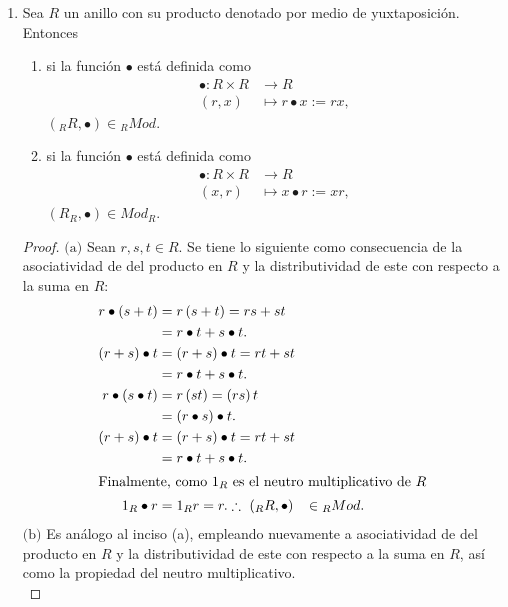 \documentclass{article}
\newcommand{\lrprth}[1]{
    \left(#1\right)
}
\newcommand{\descapp}[6]{
    #1: #2 &\rightarrow #3\\
    #4 &\mapsto #5#6 
}
\theoremstyle{definition}
\theoremstyle{plain}
\theoremstyle{plain}
\theoremstyle{definition}
\theoremstyle{definition}
\theoremstyle{definition}
\theoremstyle{definition}
\theoremstyle{definition}
\theoremstyle{definition}
\begin{document}
\begin{enumerate}[label=\textbf{Ej \arabic*.}]
    \item Sea $R$ un anillo con su producto denotado por medio de yuxtaposición. Entonces
    \begin{enumerate}[label=(\alph*)]
        \item si la función $\bullet$ está definida como
        \begin{align*}
            \descapp{\bullet}{R\times R}{R}{(r,x)}{r\bullet x:=rx}{,}
        \end{align*}
        $\lrprth{{}_RR,\bullet}\in {}_RMod$.
        \item si la función $\bullet$ está definida como
        \begin{align*}
            \descapp{\bullet}{R\times R}{R}{(x,r)}{x\bullet r:=xr}{,}
        \end{align*}
        $(R_R,\bullet)\in Mod_R$.
    \end{enumerate}
    \begin{proof}
    $\boxed{\text{(a)}}$ 
    Sean $r,s,t\in R$. Se tiene lo siguiente como consecuencia de la asociatividad de del producto en $R$ y la distributividad de este con respecto a la suma en $R$:
    \begin{align*}
        r\bullet\lrprth{s+t}&=r\lrprth{s+t}=rs+st\\
        &=r\bullet t + s\bullet t.\\
        \lrprth{r+s}\bullet t&=\lrprth{r+s}\bullet t=rt+st\\
        &=r\bullet t + s\bullet t.\\
        r\bullet\lrprth{s\bullet t}&=r\lrprth{st}=\lrprth{rs}t\\
        &=\lrprth{r\bullet s}\bullet t.\\
        \lrprth{r+s}\bullet t&=\lrprth{r+s}\bullet t=rt+st\\
        &=r\bullet t + s\bullet t.\\
        \intertext{Finalmente, como $1_R$ es el neutro multiplicativo de $R$}
        1_R\bullet r&= 1_Rr=r.
        \therefore \ \lrprth{{}_RR,\bullet}&\in {}_RMod.
    \end{align*}
    $\boxed{\text{(b)}}$ Es análogo al inciso (a), empleando nuevamente a asociatividad de del producto en $R$ y la distributividad de este con respecto a la suma en $R$, así como la propiedad del neutro multiplicativo. \\
    \end{proof}
    

\end{enumerate}
\end{document}
